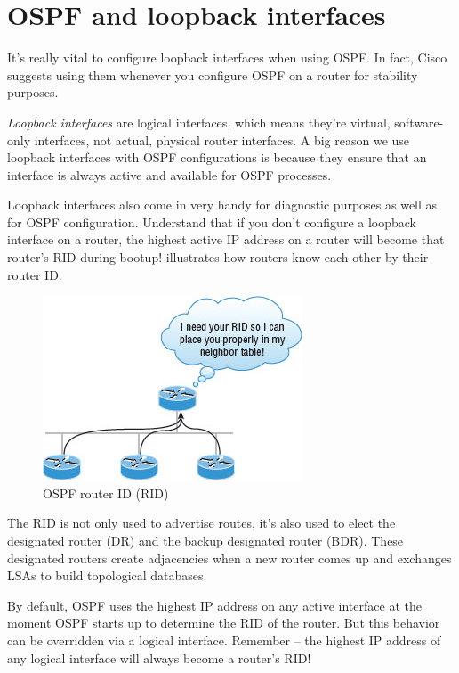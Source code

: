 \section{OSPF and loopback interfaces}

It's really vital to configure loopback interfaces when using OSPF. In
fact, Cisco suggests using them whenever you configure OSPF on a router
for stability purposes.

\emph{Loopback interfaces} are logical interfaces, which means they're
virtual, software-only interfaces, not actual, physical router
interfaces. A big reason we use loopback interfaces with OSPF
configurations is because they ensure that an interface is always active
and available for OSPF processes.

Loopback interfaces also come in very handy for diagnostic purposes as
well as for OSPF configuration. Understand that if you don't configure a
loopback interface on a router, the highest active IP address on a
router will become that router's RID during bootup!
 illustrates how routers know each other by their router ID.

\begin{figure}
\centering
   \includegraphics[width=.6\textwidth]{images/c18f006.jpg}
   \caption{OSPF router ID (RID)}
   \label{fig:ospf-router-id}
\end{figure}

The RID is not only used to advertise routes, it's also used to elect
the designated router (DR) and the backup designated router (BDR). These
designated routers create adjacencies when a new router comes up and
exchanges LSAs to build topological databases.

\begin{note}
By default, OSPF uses the highest IP address on any active interface at the moment OSPF starts up to determine the RID of the router.
But this behavior can be overridden via a logical interface.
Remember -- the highest IP address of any logical interface will always become a router's RID!
\end{note}


